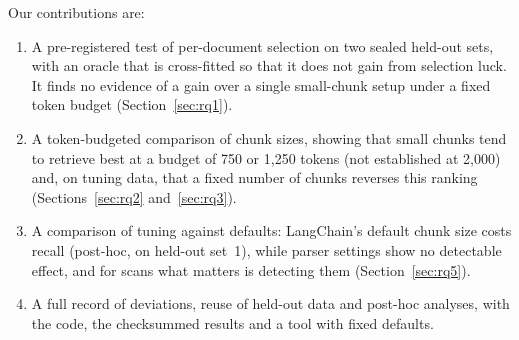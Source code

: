 Our contributions are:
\begin{enumerate}
\item A pre-registered test of per-document selection on two sealed held-out
sets, with an oracle that is cross-fitted so that it does not gain from
selection luck. It finds no evidence of a gain over a single small-chunk setup
under a fixed token budget (Section~\ref{sec:rq1}).
\item A token-budgeted comparison of chunk sizes, showing that small chunks
tend to retrieve best at a budget of 750 or 1,250 tokens (not established at
2,000) and, on tuning data, that a fixed number of chunks reverses this ranking
(Sections~\ref{sec:rq2} and~\ref{sec:rq3}).
\item A comparison of tuning against defaults: LangChain's default chunk size
costs recall (post-hoc, on held-out set~1), while parser settings show no
detectable effect, and for scans what matters is detecting them
(Section~\ref{sec:rq5}).
\item A full record of deviations, reuse of held-out data and post-hoc
analyses, with the code, the checksummed results and a tool with fixed defaults.
\end{enumerate}
